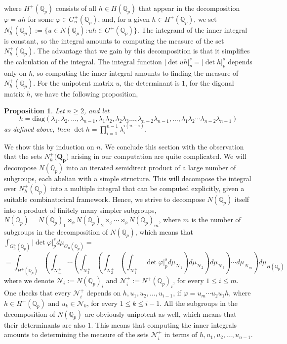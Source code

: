 \documentclass[12pt]{article}
\newtheorem{proposition}[theorem]{Proposition}
\begin{document}
where $H^+(\mathbb{Q}_p)$ consists of all $h\in H(\mathbb{Q}_p)$ that appear in the decomposition $\varphi=uh$ for some $\varphi\in G_{n}^{+}(\mathbb{Q}_p)$, and, for a given $h\in H^+(\mathbb{Q}_p)$, we set $N_h^+(\mathbb{Q}_p):=\{u\in N(\mathbb{Q}_p) : uh\in{G}^+(\mathbb{Q}_p)\}$. The integrand of the inner integral is constant, so the integral amounts to computing the measure of the set $N_{h}^+(\mathbb{Q}_p)$. The advantage that we gain by this decomposition is that it simplifies the calculation of the integral. The integral function $|\det{uh}|_p^s=|\det{h}|_p^s$ depends only on $h$, so computing the inner integral amounts to finding the measure of $N_{h}^+(\mathbb{Q}_p)$. For the unipotent matrix $u$, the determinant is $1$, for the digonal matrix $h$, we have the following proposition,
\begin{proposition}
\label{prop.h.matrix.determinant}
Let $n\geq{2}$, and let \[h=\mathrm{diag}(\lambda_{1},\lambda_{2},\dots,\lambda_{n-1},\lambda_{1}\lambda_{2},\lambda_{2}\lambda_{3}\dots,\lambda_{n-2}\lambda_{n-1},\dots,\lambda_{1}\lambda_{2}\cdots\lambda_{n-2}\lambda_{n-1})\]
as defined above, then $\det{h}=\prod_{i=1}^{n-1}\lambda_i^{i(n-i)}$.
\end{proposition}
We show this by induction on $n$.
We conclude this section with the observation that the sets $N_{h}^+(\mathbf{{Q}_p)}$ arising in our computation are quite complicated. We will decompose $N(\mathbb{Q}_p)$ into an iterated semidirect product of a large number of subgroups, each abelian with a simple structure. This will decompose the integral over $N_{h}^+(\mathbb{Q}_p)$ into a multiple integral that can be computed explicitly, given a suitable combinatorical framework. Hence, we strive to decompose $N(\mathbb{Q}_p)$ itself into a product of finitely many simpler subgroups, $N(\mathbb{Q}_p)= N(\mathbb{Q}_p)_1\rtimes_{\phi} N(\mathbb{Q}_p)_2\rtimes_{\phi}\cdots\rtimes_{\phi} N(\mathbb{Q}_p)_{m}$, where $m$ is the number of subgroups in the decomposition of $N(\mathbb{Q}_p)$, which means that $\displaystyle\int_{G_{n}^{+}(\mathbb{Q}_p)}|\det\varphi|_p^sd\mu_{G_{n}(\mathbb{Q}_p)}=$\[=\displaystyle\int_{H^+(\mathbb{Q}_p)}\left(\displaystyle\int_{\mathcal{N}^+_{m}}\cdots\left(\displaystyle\int_{\mathcal{N}^+_3}\left(\displaystyle\int_{\mathcal{N}^+_2}\left(\displaystyle\int_{\mathcal{N}^+_1}|\det\varphi|_p^sd\mu_{\mathcal{N}_1}\right)d\mu_{\mathcal{N}_2}\right)d\mu_{\mathcal{N}_3}\right)\cdots d\mu_{\mathcal{N}_{m}}\right)d\mu_{H(\mathbb{Q}_p)}\]
where we denote $\mathcal{N}_i:=N(\mathbb{Q}_p)_i$ and $\mathcal{N}^+_i:=N^+(\mathbb{Q}_p)_i$, for every $1\leq i\leq m$. One checks that every $\mathcal{N}^+_i$ depends on $h,u_1,u_2,\dots,u_{i-1}$, if $\varphi=u_{m}\cdots{u_2}{u_1}h$, where $h\in H^+(\mathbb{Q}_p)$ and $u_k\in\mathcal{N}_{k}$, for every $1\leq k\leq i-1$. 
All the subgroups in the decomposition of $N(\mathbb{Q}_p)$ are obviously unipotent as well, which means that their determinants are also $1$. This means that computing the inner integrals amounts to determining the measure of the sets $\mathcal{N}^+_i$ in terms of $h,u_1,u_2,\dots,u_{n-1}$.
\end{document}
